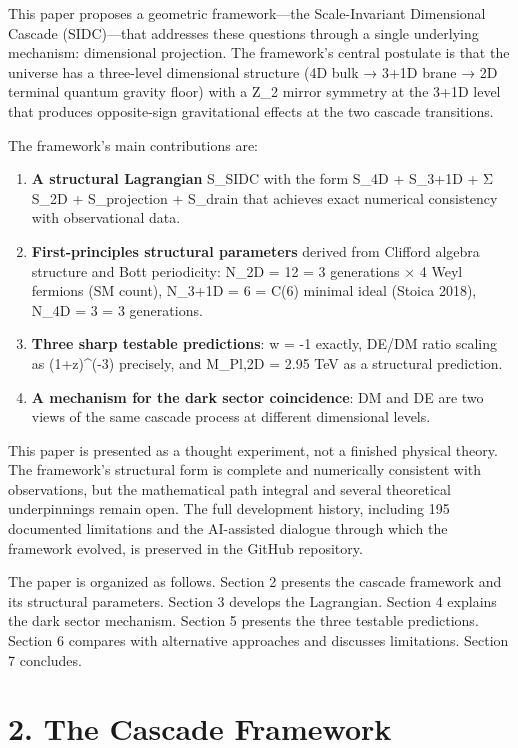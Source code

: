 \documentclass[11pt,a4paper]{article}
\begin{document}
This paper proposes a geometric framework---the Scale-Invariant
Dimensional Cascade (SIDC)---that addresses these questions through a
single underlying mechanism: dimensional projection. The framework's
central postulate is that the universe has a three-level dimensional
structure (4D bulk → 3+1D brane → 2D terminal quantum gravity floor)
with a Z\_2 mirror symmetry at the 3+1D level that produces
opposite-sign gravitational effects at the two cascade transitions.

The framework's main contributions are:

\begin{enumerate}
\def\labelenumi{\arabic{enumi}.}
\item
  \textbf{A structural Lagrangian} S\_SIDC with the form S\_4D + S\_3+1D
  + Σ S\_2D + S\_projection + S\_drain that achieves exact numerical
  consistency with observational data.
\item
  \textbf{First-principles structural parameters} derived from Clifford
  algebra structure and Bott periodicity: N\_2D = 12 = 3 generations × 4
  Weyl fermions (SM count), N\_3+1D = 6 = C(6) minimal ideal (Stoica
  2018), N\_4D = 3 = 3 generations.
\item
  \textbf{Three sharp testable predictions}: w = -1 exactly, DE/DM ratio
  scaling as (1+z)\^{}(-3) precisely, and M\_Pl,2D = 2.95 TeV as a
  structural prediction.
\item
  \textbf{A mechanism for the dark sector coincidence}: DM and DE are
  two views of the same cascade process at different dimensional levels.
\end{enumerate}

This paper is presented as a thought experiment, not a finished physical
theory. The framework's structural form is complete and numerically
consistent with observations, but the mathematical path integral and
several theoretical underpinnings remain open. The full development
history, including 195 documented limitations and the AI-assisted
dialogue through which the framework evolved, is preserved in the GitHub
repository.

The paper is organized as follows. Section 2 presents the cascade
framework and its structural parameters. Section 3 develops the
Lagrangian. Section 4 explains the dark sector mechanism. Section 5
presents the three testable predictions. Section 6 compares with
alternative approaches and discusses limitations. Section 7 concludes.

\hypertarget{the-cascade-framework}{%
\section{2. The Cascade Framework}\label{the-cascade-framework}}
\end{document}

